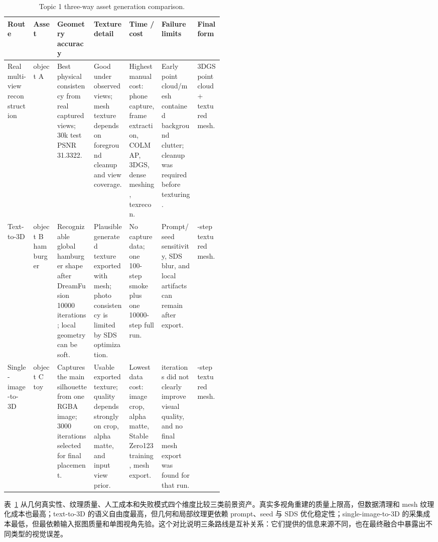 \documentclass{article}
\begin{document}
	\begin{table}[H]
		\centering
		\caption{Topic 1 three-way asset generation comparison.}
		\label{tab:topic1-three-way}
		\scriptsize
		\setlength{\tabcolsep}{2.5pt}
		\begin{tabularx}{\linewidth}{>{\raggedright\arraybackslash}p{0.12\linewidth}>{\raggedright\arraybackslash}p{0.11\linewidth}>{\raggedright\arraybackslash}X>{\raggedright\arraybackslash}X>{\raggedright\arraybackslash}p{0.15\linewidth}>{\raggedright\arraybackslash}X>{\raggedright\arraybackslash}p{0.12\linewidth}}
			\toprule
			Route & Asset & Geometry accuracy & Texture detail & Time / cost & Failure limits & Final form \\
			\midrule
			Real multi-view reconstruction & object A & Best physical consistency from real captured views; 30k test PSNR 31.3322. & Good under observed views; mesh texture depends on foreground cleanup and view coverage. & Highest manual cost: phone capture, frame extraction, COLMAP, 3DGS, dense meshing, texrecon. & Early point cloud/mesh contained background clutter; cleanup was required before texturing. & 3DGS point cloud + textured mesh. \\
			Text-to-3D & object B hamburger & Recognizable global hamburger shape after DreamFusion 10000 iterations; local geometry can be soft. & Plausible generated texture exported with mesh; photo consistency is limited by SDS optimization. & No capture data; one 100-step smoke plus one 10000-step full run. & Prompt/seed sensitivity, SDS blur, and local artifacts can remain after export. & 10000-step textured mesh. \\
			Single-image-to-3D & object C toy & Captures the main silhouette from one RGBA image; 3000 iterations selected for final placement. & Usable exported texture; quality depends strongly on crop, alpha matte, and input view prior. & Lowest data cost: image crop, alpha matte, Stable Zero123 training, mesh export. & 10000 iterations did not clearly improve visual quality, and no final mesh export was found for that run. & 3000-step textured mesh. \\
			\bottomrule
		\end{tabularx}
	\end{table}

	表~\ref{tab:topic1-three-way} 从几何真实性、纹理质量、人工成本和失败模式四个维度比较三类前景资产。真实多视角重建的质量上限高，但数据清理和 mesh 纹理化成本也最高；text-to-3D 的语义自由度最高，但几何和局部纹理更依赖 prompt、seed 与 SDS 优化稳定性；single-image-to-3D 的采集成本最低，但最依赖输入抠图质量和单图视角先验。这个对比说明三条路线是互补关系：它们提供的信息来源不同，也在最终融合中暴露出不同类型的视觉误差。
\end{document}
